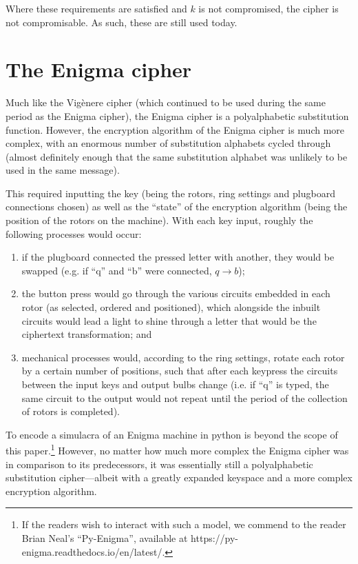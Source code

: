 \documentclass{AIAA}
\begin{document}
Where these requirements are satisfied and $k$ is not compromised, the cipher is not compromisable. As such, these are still used today.

\section{The Enigma cipher}
Much like the Vig\`enere cipher (which continued to be used during the same period as the Enigma cipher), the Enigma cipher is a polyalphabetic substitution function. However, the encryption algorithm of the Enigma cipher is much more complex, with an enormous number of substitution alphabets cycled through (almost definitely enough that the same substitution alphabet was unlikely to be used in the same message). 

This required inputting the key (being the rotors, ring settings and plugboard connections chosen) as well as the ``state'' of the encryption algorithm (being the position of the rotors on the machine). With each key input, roughly the following processes would occur:

\begin{enumerate}
\item if the plugboard connected the pressed letter with another, they would be swapped (e.g. if ``q'' and ``b'' were connected, $q \longrightarrow b$);
\item the button press would go through the various circuits embedded in each rotor (as selected, ordered and positioned), which alongside the inbuilt circuits would lead a light to shine through a letter that would be the ciphertext transformation; and
\item mechanical processes would, according to the ring settings, rotate each rotor by a certain number of positions, such that after each keypress the circuits between the input keys and output bulbs change (i.e. if ``q'' is typed, the same circuit to the output would not repeat until the period of the collection of rotors is completed).
\end{enumerate}

To encode a simulacra of an Enigma machine in python is beyond the scope of this paper.\footnote{If the readers wish to interact with such a model, we commend to the reader Brian Neal's ``Py-Enigma'', available at https://py-enigma.readthedocs.io/en/latest/.}  However, no matter how much more complex the Enigma cipher was in comparison to its predecessors, it was essentially still a polyalphabetic substitution cipher---albeit with a greatly expanded keyspace and a more complex encryption algorithm.
\end{document}
